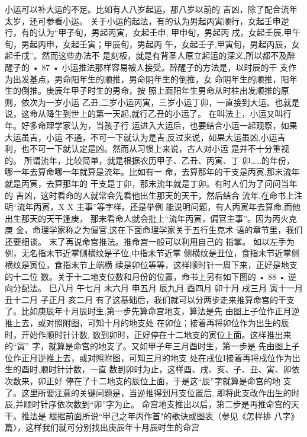 小运可以补大运的不足。比如有人八岁起运，那八岁以前的
吉凶，除了配合流年太岁，还可参看小运。
关于小运的起法，有的认为男起丙寅顺行，女起壬申逆
行，有的认为“甲子旬，男起丙寅，女起壬申, 甲申旬，男起丙
戌，女起壬辰,甲午旬，男起丙申，女起壬寅；甲辰旬，男起丙
午，女起壬子,甲寅旬，男起丙辰，女起壬戌”。然而这些办法不
是刻板，就是有背圣人原立起运的深义,所以都不及醉醒子的
• 87 •
小运推法那样容易被人接受。醉醒子的方法是，以时辰的干
支作为出发基点，男命阳年生的顺推，男命阴年生的倒推，女
命阴年生的顺推，阳年生的倒推。庚辰年甲子时生的男命，按
照上面阳年生男命从时柱出发顺推的原则，依次为一岁小运
乙丑,二岁小运丙寅，三岁小运丁卯，一直接到大运。也就是
说，这命从降生到世上的第一天起,就行乙丑的小运了。
在叫法上，小运又叫行年。好多命理学家认为，当孩子行
运进入大运后，也要结合小运一起观察，如果大运虽吉，小运
不通，不可一下就认为是吉;反过来说，如果大运虽凶,小运吉
利，也不可一下就认定是凶。然而从习惯上来说，古人对小运
是并不十分重视的。
所谓流年，比较简单，就是根据农历甲子、乙丑、丙寅、丁
卯……的年份，哪一年去算命哪一年就算是流年。比如有一 命，去算那年的干支是丙寅,那末流年就是丙寅，去算那年的
干支是丁卯，那末流年就是丁卯。有时人们为了问问当年的
吉凶，这时看命的人就常会先看他出生那天的天干，然后结合
流年,在命书上注明“流年丙寅，X X 主事”等字样。还是举例
能说明问题，有人丙寅年去算命,而他出生那天的天干逢庚，
那末看命人就会批上“流年丙寅，偏官主事”。因为丙火克庚
金，命理学家称之为偏官,这在下面命理学家关于五行生克术
语的章节里，我们还要细谈。
末了再说命宫推法。推命宫一般可以利用自己的 指掌。
如以左手为例，无名指末节近掌侧横纹是子位,中指末节近掌
侧横纹是丑位，食指末节近掌侧横纹是寅位，食指末节上端横
续是卯位等等，这样顺时针一周下来，正好是地支的十二位
数。关于十二地支位数和月份的位置，命书上另有如下图的
• 88 •
逆向分配法。
巳八月 午七月 未六月 申五月
辰九月 酉四月
卯十月 戌三月
寅十一月 丑十二月 子正月 亥二月
有了这基础后，我们就可以分两步走来推算命宫的干支
了。比如庚辰年十月辰时生,第一步先算命宫地支，算法是先
由图上子位作正月逆推上去，或对照附图，可知十月的地支处
在卯位；接着再将卯位作为出生的辰时，开始作顺时针计数,
数到卯时，正好停在十二地支的寅位上面。这样推出来的“寅”
字，就算是命宫的地支了。又如甲子年三月酉时生，第一步是
先由图上子位作正月逆推上去，或对照附图，可知三月的地支
处在戌位I接着再将戌位作为出生的酉时,顺时针计数，一直
数到卯时为止，这样酉、戌、亥、子、丑、寅、卯依次数来，卯正好
停在了十二地支的辰位上面，于是这“辰”字就算是命宫的地
支了。这里所要注意的关键问题是，当逆推得到月支位置后,
即将此支改作出生的时辰,并顺时针序依次数到“卯”字为止。
命宫地支推出以后，第二步是再推命宫的天干。推法是
根据前面所说“甲己之年丙作首"的歌诀或图表（参见《怎样排
八字》篇〉，这样我们就可分别找出庚辰年十月辰时生的命宫

